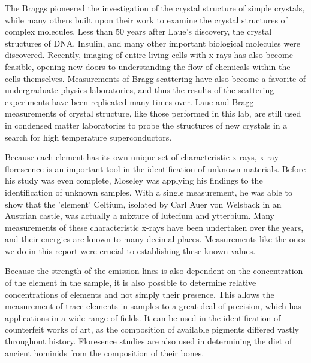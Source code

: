 \documentclass[%
 reprint,
 amsmath,amssymb,
 aps,
 pra,
]{revtex4-1}
\begin{document}
The Braggs pioneered the investigation of the crystal structure of simple crystals\cite{bragg, xray_history}, while many others built upon their work to examine the crystal structures of complex molecules. Less than 50 years after Laue's discovery, the crystal structures of DNA\cite{dna1, dna2}, Insulin\cite{insulin}, and many other important biological molecules were discovered\cite{scatter_medicine_1, scatter_medicine_2}. Recently, imaging of entire living cells with x-rays has also become feasible, opening new doors to understanding the flow of chemicals within the cells themselves\cite{whole_cells}. Measurements of Bragg scattering have also become a favorite of undergraduate physics laboratories, and thus the results of the scattering experiments have been replicated many times over\cite{scatter_lab_1, scatter_lab_2, jensen}. Laue and Bragg measurements of crystal structure, like those performed in this lab, are still used in condensed matter laboratories to probe the structures of new crystals in a search for high temperature superconductors\cite{aronson, aronson2}.

Because each element has its own unique set of characteristic x-rays, x-ray florescence is an important tool in the identification of unknown materials. Before his study was even complete, Moseley was applying his findings to the identification of unknown samples. With a single measurement, he was able to show that the 'element' Celtium, isolated by Carl Auer von Welsback in an Austrian castle, was actually a mixture of lutecium and ytterbium\cite{xray_history}. Many measurements of these characteristic x-rays have been undertaken over the years, and their energies are known to many decimal places\cite{database1, database2}. Measurements like the ones we do in this report were crucial to establishing these known values.

Because the strength of the emission lines is also dependent on the concentration of the element in the sample\cite{miller}, it is also possible to determine relative concentrations of elements and not simply their presence. This allows the measurement of trace elements in samples to a great deal of precision, which has applications in a wide range of fields. It can be used in the identification of counterfeit works of art\cite{art1, art2, art3}, as the composition of available pigments differed vastly throughout history. Floresence studies are also used in determining the diet of ancient hominids from the composition of their bones\cite{art3, arch1, arch2, traces}.
\end{document}
